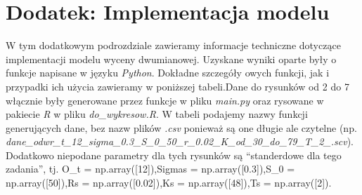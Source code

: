 \documentclass[
]{article}
\begin{document}
\hypertarget{dodatek-implementacja-modelu}{%
\section{Dodatek: Implementacja
modelu}\label{dodatek-implementacja-modelu}}

W tym dodatkowym podrozdziale zawieramy informacje techniczne dotyczące
implementacji modelu wyceny dwumianowej. Uzyskane wyniki oparte były o
funkcje napisane w języku \emph{Python}. Dokładne szczegóły owych
funkcji, jak i przypadki ich użycia zawieramy w poniższej tabeli.Dane do
rysunków od 2 do 7 włącznie były generowane przez funkcje w pliku
\emph{main.py} oraz rysowane w pakiecie \emph{R} w pliku
\emph{do\_wykresow.R}. W tabeli podajemy nazwy funkcji generujących
dane, bez nazw plików \emph{.csv} ponieważ są one długie ale czytelne
(np.
\emph{dane\_odwr\_t\_12\_sigma\_0.3\_S\_0\_50\_r\_0.02\_K\_od\_30\_do\_79\_T\_2\_.scv}).
Dodatkowo niepodane parametry dla tych rysunków są ``standerdowe dla
tego zadania'', tj. O\_t = np.array({[}12{]}),Sigmas =
np.array({[}0.3{]}),S\_0 = np.array({[}50{]}),Rs =
np.array({[}0.02{]}),Ks = np.array({[}48{]}),Ts = np.array({[}2{]}).

\begingroup\fontsize{7}{9}\selectfont
\end{document}
